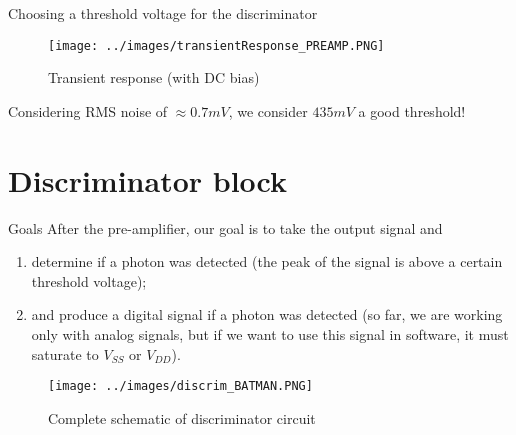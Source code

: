 \documentclass[aspectratio=169,xcolor=dvipsnames]{beamer}
\begin{document}
	\begin{frame}{Choosing a threshold voltage for the discriminator}
		\begin{figure}[h!]
			\centering
			\texttt{[image: ../images/transientResponse\_PREAMP.PNG]}
			\label{fig:transient}
			\caption{Transient response (with DC bias)}
		\end{figure}
		\begin{block}{}
			Considering RMS noise of $\approx 0.7mV$, we consider $435mV$ a good threshold!
		\end{block}
	\end{frame}
	
	\section{Discriminator block}
	
	\begin{frame}{Goals}
		After the pre-amplifier, our goal is to take the output signal and
		\begin{enumerate}
			\item determine if a photon was detected (the peak of the signal is above a certain threshold voltage);
			\item and produce a digital signal if a photon was detected (so far, we are working only with analog signals, but if we want to use this signal in software, it must saturate to $V_{SS}$ or $V_{DD}$).
		\end{enumerate}
		\begin{figure}[h!]
			\centering
			\texttt{[image: ../images/discrim\_BATMAN.PNG]}
			\label{BATMAN}
			\caption{Complete schematic of discriminator circuit}
		\end{figure} 
	\end{frame}
	
\end{document}
